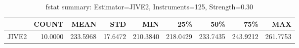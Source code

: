 \begin{table}[ht]
\centering
\caption{fstat summary: Estimator=JIVE2, Instruments=125, Strength=0.30}
\begin{tabular}{lrrrrrrrr}
\toprule
 & COUNT & MEAN & STD & MIN & 25\% & 50\% & 75\% & MAX \\
\midrule
JIVE2 & 10.0000 & 233.5968 & 17.6472 & 210.3840 & 218.0429 & 233.7435 & 243.9212 & 261.7753 \\
\bottomrule
\end{tabular}
\end{table}
